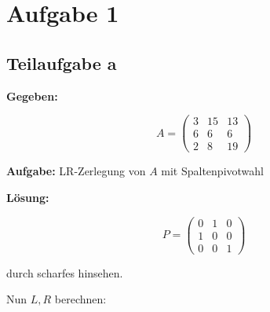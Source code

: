 \section*{Aufgabe 1}
\subsection*{Teilaufgabe a}
\textbf{Gegeben:}

\[A = 
\begin{pmatrix}
    3 & 15 & 13 \\
    6 & 6  & 6  \\
    2 & 8  & 19
\end{pmatrix}\]

\textbf{Aufgabe:} LR-Zerlegung von $A$ mit Spaltenpivotwahl

\textbf{Lösung:} 

\[P = 
\begin{pmatrix}
    0 & 1 & 0 \\
    1 & 0 & 0  \\
    0 & 0 & 1
\end{pmatrix}\]

durch scharfes hinsehen.

Nun $L, R$ berechnen:

